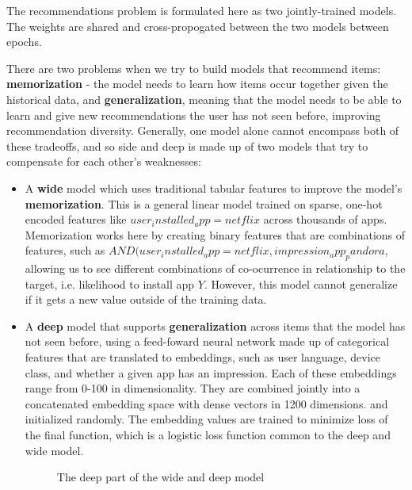 \documentclass[11pt, table]{diazessay} %
\begin{document}
\begin{sloppypar}
The recommendations problem is formulated here as two jointly-trained models. The weights are shared and cross-propogated between the two models between epochs. 

There are two problems when we try to build models that recommend items: \textbf{memorization} - the model needs to learn how items occur together given the historical data, and \textbf{generalization}, meaning that the model needs to be able to learn and give new recommendations the user has not seen before, improving recommendation diversity. Generally, one model alone cannot encompass both of these tradeoffs, and so side and deep is made up of two models that try to compensate for each other's weaknesses: 

\begin{itemize}
  \item A \textbf{wide} model which uses traditional tabular features to improve the model's \textbf{memorization}. This is a general linear model trained on sparse, one-hot encoded features like $user_installed_app=netflix$ across thousands of apps. Memorization works here by creating binary features that are combinations of features, such as $AND(user_installed_app=netflix, impression_app_pandora$, allowing us to see different combinations of co-ocurrence in relationship to the target, i.e. likelihood to install app $Y$. However, this model cannot generalize if it gets a new value outside of the training data. 
  \item A \textbf{deep} model that supports \textbf{generalization} across items that the model has not seen before, using a feed-foward neural network made up of categorical features that are translated to embeddings, such as user language, device class, and whether a given app has an impression. Each of these embeddings range from 0-100 in dimensionality. They are combined jointly into a concatenated embedding space with dense vectors in 1200 dimensions.  and initialized randomly. The embedding values are trained to minimize loss of the final function, which is a logistic loss function common to the deep and wide model.  
\begin{figure}[H]
\caption{The deep part of the wide and deep model\citep{cheng2016wide}}
\end{figure}
\end{itemize}


\end{sloppypar}
\end{document}
